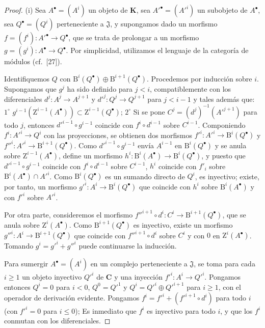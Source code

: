 \begin{proof}
{\rm(i)}
Sea $A^\bullet=(A^i)$ un objeto de $\boldsymbol{K}$, sea $A'^\bullet=(A'^i)$ un subobjeto de $A^\bullet$, sea $Q^\bullet=(Q^i)$ perteneciente a $\mathfrak J$, y supongamos dado un morfismo
$f=(f^i):A'^\bullet\to Q^\bullet$, que se trata de prolongar a un morfismo $g=(g^i):A^\bullet\to Q^\bullet$.
Por simplicidad, utilizamos el lenguaje de la categoría de módulos (cf.~[27]).

Identifiquemos $Q$ con $\mathrm B^i(Q^\bullet)\oplus\mathrm B^{i+1}(Q^\bullet)$.
Procedemos por inducción sobre $i$.
Supongamos que $g^j$ ha sido definido para $j<i$, compatiblemente con los diferenciales $d^j:A^j\to A^{j+1}$ y $d'^j:Q^j\to Q^{j+1}$ para $j<i-1$ y tales además que: $1^\circ$ $g^{i-1}(\mathrm Z^{i-1}(A^\bullet))\subset
\mathrm Z^{i-1}(Q^\bullet)$; $2^\circ$ Si se pone $C^j=(d^j)^{-1}(A'^{j+1})$ para todo $j$, entonces $d'^{i-1}\circ g^{i-1}$ coincide con $f^i\circ d^{i-1}$ sobre $C^{i-1}$.
Componiendo $f^i:A'^i\to Q^i$ con las proyecciones, se obtienen dos morfismos $f'^i:A'^i\to\mathrm B^i(Q^\bullet)$ y $f''^i:A'^i\to\mathrm B^{i+1}(Q^\bullet)$. Como $d'^{i-1}\circ g^{i-1}$ envía $A^{i-1}$ en $\mathrm B^i(Q^\bullet)$ y se anula sobre $\mathrm Z^{i-1}(A^\bullet)$, define un morfismo
$h^i:\mathrm B^i(A^\bullet)\to\mathrm B^i(Q^\bullet)$, y puesto que $d'^{i-1}\circ g^{i-1}$ coincide con $f^i\circ d^{i-1}$ sobre $C^{i-1}$, $h^i$ coincide con $f'_i$ sobre $\mathrm B^i(A^\bullet)\cap A'^i$.
Como $\mathrm B^i(Q^\bullet)$ es un sumando directo de $Q^i$, es inyectivo; existe, por tanto, un morfismo
$g'^i:A^i\to\mathrm B^i(Q^\bullet)$
que coincide con $h^i$ sobre $\mathrm B^i(A^\bullet)$ y con $f'^i$ sobre $A'^i$.

Por otra parte, consideremos el morfismo
$f''^{i+1}\circ d^i:C^i\to\mathrm B^{i+1}(Q^\bullet)$,
que se anula sobre $\mathrm Z^i(A^\bullet)$.
Como $\mathrm B^{i+1}(Q^\bullet)$ es inyectivo, existe un morfismo
$g''^i:A^i\to\mathrm B^{i+1}(Q^\bullet)$
que coincide con $f''^{i+1}\circ d^i$ sobre $C^i$ y con $0$ en $\mathrm Z^i(A^\bullet)$.
Tomando $g^i=g'^i+g''^i$ puede continuarse la inducción.

\smallskip
{}
Para sumergir $A^\bullet=(A^i)$ en un complejo perteneciente a $\mathfrak J$, se toma para cada $i\geq1$ un objeto inyectivo $Q'^i$ de $\boldsymbol{C}$ y una inyección $f'^i:A^i\to Q'^i$. Pongamos entonces $Q^i=0$ para $i<0$, $Q^0=Q'^1$ y $Q^i=Q'^i\oplus Q'^{i+1}$ para $i\geq1$, con el operador de derivación evidente. Pongamos
$f^i=f'^i+(f'^{i+1}\circ d^i)$ para todo $i$ (con $f'^i=0$ para $i\leq0$);
Es inmediato que $f^i$ es inyectivo para todo $i$, y que los $f^i$ conmutan con los diferenciales.
\end{proof}

